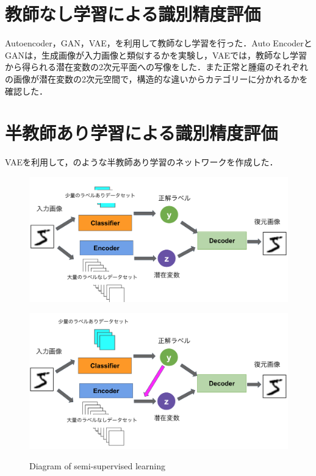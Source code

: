 \section{教師なし学習による識別精度評価}
Autoencoder，GAN，VAE，を利用して教師なし学習を行った．Auto EncoderとGANは，生成画像が入力画像と類似するかを実験し，VAEでは，教師なし学習から得られる潜在変数の2次元平面への写像をした．また正常と腫瘍のそれぞれの画像が潜在変数の2次元空間で，構造的な違いからカテゴリーに分かれるかを確認した．


\section{半教師あり学習による識別精度評価}
VAEを利用して，のような半教師あり学習のネットワークを作成した．

\begin{figure}[H]
	\centering
	\begin{minipage}{\columnwidth}
		\centering
		\includegraphics[width=0.7\linewidth]{fig/chapter3/networks/patern_A}
		\label{fig:VAE-a}
	\end{minipage}
	
	\begin{minipage}{\columnwidth}
		\centering
		\includegraphics[width=0.7\linewidth]{fig/chapter3/networks/patern_B}
		\label{fig:VAE-b}
	\end{minipage}
	
	\caption{Diagram of semi-supervised learning}
	\label{fig:半教師}
	
\end{figure}



